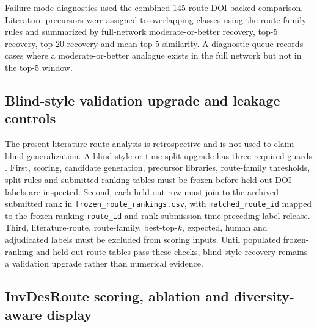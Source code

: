 \documentclass[11pt, letterpaper]{article}
\newcommand{\invdesroute}{InvDesRoute}
\begin{document}
Failure-mode diagnostics used the combined 145-route DOI-backed comparison. Literature precursors were assigned to overlapping classes using the route-family rules and summarized by full-network moderate-or-better recovery, top-5 recovery, top-20 recovery and mean top-5 similarity. A diagnostic queue records cases where a moderate-or-better analogue exists in the full network but not in the top-5 window.

\subsection*{Blind-style validation upgrade and leakage controls}

The present literature-route analysis is retrospective and is not used to claim blind generalization. A blind-style or time-split upgrade has three required guards \cite{kapoor2023leakage}. First, scoring, candidate generation, precursor libraries, route-family thresholds, split rules and submitted ranking tables must be frozen before held-out DOI labels are inspected. Second, each held-out row must join to the archived submitted rank in \texttt{frozen\_route\_rankings.csv}, with \texttt{matched\_route\_id} mapped to the frozen ranking \texttt{route\_id} and rank-submission time preceding label release. Third, literature-route, route-family, best-top-$k$, expected, human and adjudicated labels must be excluded from scoring inputs. Until populated frozen-ranking and held-out route tables pass these checks, blind-style recovery remains a validation upgrade rather than numerical evidence.

\subsection*{\invdesroute{} scoring, ablation and diversity-aware display}
\end{document}
